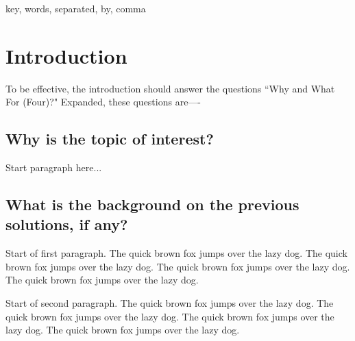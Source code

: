 \documentclass[journal]{./IEEE/IEEEtran}
\title{\SPTITLE}
\author{\ADVISEE~and~\ADVISER%
\REMARK
}
\begin{document}
\maketitle

\begin{abstract}
The abstract should be \textit{informational}. Typically a single paragraph
of about fifty to two hundred workds, the abstract allows your readers to judge
whether or not the article is of relevance to them. It should therefore be
a concise summary of the aims, scope, and conclusions of your work. There
is no space for unnecessary texts; an abstract should be kept to as few words
as possible while remaining reasonably informative. Irrelevancies, such as
minor details or a \textit{description} of the structure of the paper, are
inappropriate, as are acronyms, abbreviations, and mathematics. Sentences such
as ``we review relevant literature" should be omitted.\cite{matt1}
\end{abstract}

\begin{keywords}
key, words, separated, by, comma
\end{keywords}

\section{Introduction}
To be effective, the introduction should answer the questions ``Why and What For (Four)?" Expanded, these questions are----

\subsection{Why is the topic of interest?}
Start paragraph here...

\subsection{What is the background on the previous solutions, if any?}
Start of first paragraph. The quick brown fox jumps over the lazy dog. The quick
brown fox jumps over the lazy dog. The quick brown fox jumps over the lazy dog. The
quick brown fox jumps over the lazy dog.

Start of second paragraph. The quick brown fox jumps over the lazy dog. The quick
brown fox jumps over the lazy dog. The quick brown fox jumps over the lazy dog. The
quick brown fox jumps over the lazy dog.
\end{document}
